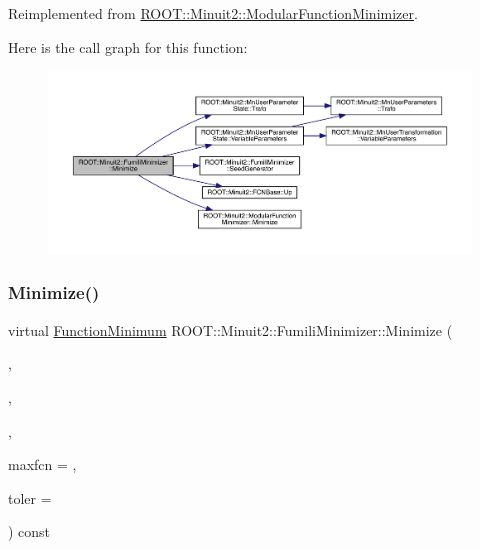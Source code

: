 Reimplemented from \mbox{\hyperlink{classROOT_1_1Minuit2_1_1ModularFunctionMinimizer_a2e1e21161544b931511204cdedac914d}{R\+O\+O\+T\+::\+Minuit2\+::\+Modular\+Function\+Minimizer}}.

Here is the call graph for this function\+:
\nopagebreak
\begin{figure}[H]
\begin{center}
\leavevmode
\includegraphics[width=350pt]{db/da1/classROOT_1_1Minuit2_1_1FumiliMinimizer_afe0f09e5e093e65ac8fadc13c459ad5c_cgraph}
\end{center}
\end{figure}
\mbox{\label{classROOT_1_1Minuit2_1_1FumiliMinimizer_a2bffd3a7c3090b841f8c23248b83b16e}} 
\subsubsection{\texorpdfstring{Minimize()}{Minimize()}\hspace{0.1cm}{\footnotesize\ttfamily [5/33]}}
{\footnotesize\ttfamily virtual \mbox{\hyperlink{classROOT_1_1Minuit2_1_1FunctionMinimum}{Function\+Minimum}} R\+O\+O\+T\+::\+Minuit2\+::\+Fumili\+Minimizer\+::\+Minimize (\begin{DoxyParamCaption}\item[{const \mbox{\hyperlink{classROOT_1_1Minuit2_1_1FCNGradientBase}{F\+C\+N\+Gradient\+Base}} \&}]{,  }\item[{const \mbox{\hyperlink{classROOT_1_1Minuit2_1_1MnUserParameterState}{Mn\+User\+Parameter\+State}} \&}]{,  }\item[{const \mbox{\hyperlink{classROOT_1_1Minuit2_1_1MnStrategy}{Mn\+Strategy}} \&}]{,  }\item[{unsigned int}]{maxfcn = {},  }\item[{double}]{toler = {} }\end{DoxyParamCaption}) const\hspace{0.3cm}{\ttfamily [virtual]}}



